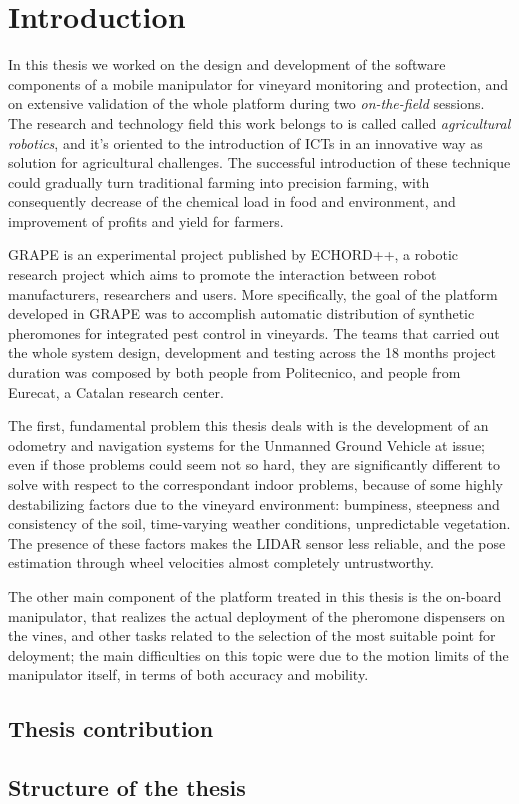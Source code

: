 
\chapter{Introduction} \label{chap:introduction}

In this thesis we worked on the design and development of the software components of a mobile manipulator for vineyard monitoring and protection, and on extensive validation of the whole platform during two \textit{on-the-field} sessions. The research and technology field this work belongs to is called called  \textit{agricultural robotics}, and it's oriented to the introduction of ICTs in an innovative way as solution for agricultural challenges. The successful introduction of these technique could gradually turn traditional farming into precision farming, with consequently decrease of the chemical load in food and environment, and improvement of profits and yield for farmers.

\par \ac{GRAPE} is an experimental project published by \ac{ECHORD++}, a robotic research project which aims to promote the interaction between robot manufacturers, researchers and users. More specifically, the goal of the platform developed in \ac{GRAPE} was to accomplish automatic distribution of synthetic pheromones for integrated pest control in vineyards.
The teams that carried out the whole system design, development and testing across the 18 months project duration was composed by both people from Politecnico, and people from Eurecat, a Catalan research center. 

The first, fundamental problem this thesis deals with is the development of an odometry and navigation systems for the Unmanned Ground Vehicle at issue; even if those problems could seem not so hard, they are significantly different to solve with respect to the correspondant indoor problems, because of some highly destabilizing factors due to the vineyard environment: bumpiness, steepness and consistency of the soil, time-varying weather conditions, unpredictable vegetation. The presence of these factors makes the \ac{LIDAR} sensor less reliable, and the pose estimation through wheel velocities almost completely untrustworthy.

The other main component of the platform treated in this thesis is the on-board manipulator, that realizes the actual deployment of the pheromone dispensers on the vines, and other tasks related to the selection of the most suitable point for deloyment; the main difficulties on this topic were due to the motion limits of the manipulator itself, in terms of both accuracy and mobility.


\section{Thesis contribution}

\section{Structure of the thesis}